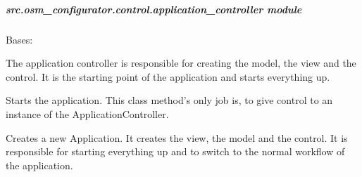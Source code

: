\documentclass[letterpaper,10pt,english]{sphinxmanual}
\begin{document}
\subparagraph{src.osm\_configurator.control.application\_controller module}
\label{\detokenize{apidoc/src.osm_configurator.control:module-src.osm_configurator.control.application_controller}}\label{\detokenize{apidoc/src.osm_configurator.control:src-osm-configurator-control-application-controller-module}}

\begin{fulllineitems}
\label{\detokenize{apidoc/src.osm_configurator.control:src.osm_configurator.control.application_controller.ApplicationController}}
\pysigstartsignatures
{}
\pysigstopsignatures
\sphinxAtStartPar
Bases: 

\sphinxAtStartPar
The application controller is responsible for creating the model, the view and the control. It is the starting point of the application and starts everything up.

\begin{fulllineitems}
\label{\detokenize{apidoc/src.osm_configurator.control:src.osm_configurator.control.application_controller.ApplicationController.main}}
\pysigstartsignatures
{}
\pysigstopsignatures
\sphinxAtStartPar
Starts the application.
This class method’s only job is, to give control to an instance of the ApplicationController.

\end{fulllineitems}


\begin{fulllineitems}
\label{\detokenize{apidoc/src.osm_configurator.control:src.osm_configurator.control.application_controller.ApplicationController.__init__}}
\pysigstartsignatures
{}
\pysigstopsignatures
\sphinxAtStartPar
Creates a new Application. It creates the view, the model and the control. It is responsible for starting everything up and to switch to the normal workflow of the application.

\end{fulllineitems}


\end{fulllineitems}
\end{document}
